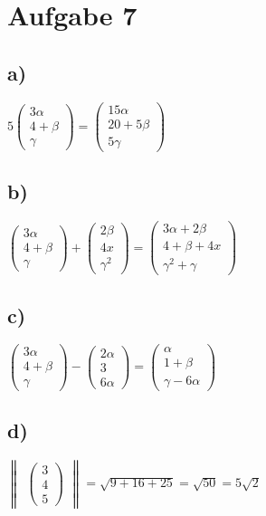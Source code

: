 \section*{Aufgabe 7}
\subsection*{a)}
$5
\begin{pmatrix}
3\alpha \\
4 + \beta \\
\gamma
\end{pmatrix}
=
\begin{pmatrix}
15\alpha \\
20 + 5\beta \\
5\gamma
\end{pmatrix}$
\subsection*{b)}
$\begin{pmatrix}
3\alpha \\
4 + \beta \\
\gamma
\end{pmatrix}
+
\begin{pmatrix}
2\beta \\
4x \\
\gamma^2
\end{pmatrix}
=
\begin{pmatrix}
3\alpha + 2\beta \\
4 + \beta + 4x \\
\gamma^2 + \gamma
\end{pmatrix}$
\subsection*{c)}
$\begin{pmatrix}
3\alpha \\
4 + \beta \\
\gamma
\end{pmatrix}
-
\begin{pmatrix}
2\alpha \\
3 \\
6\alpha
\end{pmatrix}
=
\begin{pmatrix}
\alpha \\
1 + \beta \\
\gamma - 6\alpha
\end{pmatrix}$
\subsection*{d)}
$
\begin{Vmatrix}
\begin{pmatrix}
3 \\
4 \\
5
\end{pmatrix}
\end{Vmatrix}
= \sqrt{9 + 16 + 25} = \sqrt{50} = 5\sqrt{2}
$

